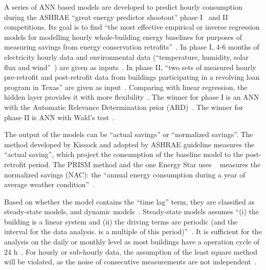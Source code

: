 \documentclass[12pt]{article}
\begin{document}
A series of ANN based models are developed to predict hourly
consumption during the ASHRAE ``great energy predictor shootout''
phase I~\cite{kreider1994predicting} and II~\cite{haberl1998great}
competitions. Its goal is to find ``the most effective empirical or
inverse regression models for modelling hourly whole-building energy
baselines for purposes of measuring savings from energy conservation
retrofits''~\cite{haberl1998great}. In phase I, 4-6 months of
electricity hourly data and environmental data (``temperature,
humidity, solar flux and wind''~\cite{mackay1996bayesian}) are given
as inputs~\cite{brown2012kernel}. In phase II, ``two sets of measured
hourly pre-retrofit and post-retrofit data from buildings
participating in a revolving loan program in Texas'' are given as
input~\cite{haberl1998great}. %
Comparing with linear regression, the hidden layer provides it with
more flexibility~\cite{mackay1996bayesian}. The winner for phase I is
an ANN with the Automatic Relevance Determination prior
(ARD)~\cite{mackay1996bayesian}. The winner for phase II is ANN with
Wald’s test~\cite{dodier2004statistical}.

The output of the models can be ``actual savings'' or ``normalized
savings''. The method developed by Kissock and adopted by ASHRAE
guideline measures the ``actual saving'', which project the
consumption of the baseline model to the post-retrofit period. The
PRISM method and the one Energy Star uses ~\cite{pmWeather} measures
the normalized savings (NAC): the ``annual energy consumption during a year
of average weather condition''~\cite{reddy1997baselining}.

Based on whether the model contains the ``time lag'' term, they are
classified as steady-state models, and dynamic
models~\cite{edition2013ashrae}. Steady-state models assumes ``(i) the
building is a linear system and (ii) the driving terms are periodic
(and the interval for the data analysis.  is a multiple of this
period)''~\cite{rabl1992energy}. It is sufficient for the analysis on
the daily or monthly level as most buildings have a operation cycle of
24 h~\cite{rabl1992energy}. For hourly or sub-hourly data, the
assumption of the least square method will be violated, as the noise
of consecutive measurements are not
independent~\cite{hammarsten1987critical}.
\end{document}
